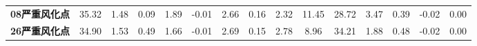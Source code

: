 \documentclass[withoutpreface,bwprint]{cumcmthesis} %
\begin{document}
\begin{appendices}
\begin{table}[!h]
\begin{tabular}{@{}ccccccccccccccc@{}}
			\textbf{08严重风化点} & 35.32                                                          & 1.48                                                          & 0.09                                                         & 1.89                                                         & -0.01                                                        & 2.66                                                           & 0.16                                                           & 2.32                                                         & 11.45                                                        & 28.72                                                        & 3.47                                                            & 0.39                                                         & -0.02                                                         & 0.00                                                          \\
			\textbf{26严重风化点} & 34.90                                                          & 1.53                                                          & 0.49                                                         & 1.66                                                         & -0.01                                                        & 2.69                                                           & 0.15                                                           & 2.78                                                         & 8.96                                                         & 34.21                                                        & 1.88                                                            & 0.48                                                         & -0.02                                                         & 0.00                                                          \\ \bottomrule
		\end{tabular}
	\end{table}


\end{appendices}
\end{document}
